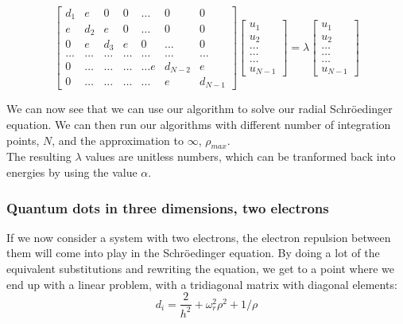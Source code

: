 \documentclass{article}
\begin{document}
			\begin{equation*}
				\begin{bmatrix}
					d_1 & e & 0   & 0    & \dots  &0     & 0 \\
					e & d_2 & e & 0    & \dots  &0     &0 \\
					0   & e & d_3 & e  &0       &\dots & 0\\
					\dots  & \dots & \dots & \dots  &\dots      &\dots & \dots\\
					0   & \dots & \dots & \dots  &\dots  e     &d_{N-2} & e\\
					0   & \dots & \dots & \dots  &\dots       &e & d_{N-1}
				\end{bmatrix} 
				\begin{bmatrix}
					u_{1} \\
					u_{2} \\
					\dots\\ \dots\\ \dots\\
					u_{N-1}
				\end{bmatrix}
				= \lambda \begin{bmatrix}
					u_{1} \\
					u_{2} \\
					\dots\\ \dots\\ \dots\\
					u_{N-1}
				\end{bmatrix}
				\label{eq:sematrix}
			\end{equation*}

			We can now see that we can use our algorithm to solve our radial Schröedinger equation.
			We can then run our algorithms with different number of integration points,
			$N$, and the approximation to $\infty$, $\rho_{max}$.\\
			The resulting $\lambda$ values are unitless numbers,
			which can be tranformed back into energies by using the value $\alpha$.
		 
		\subsubsection{Quantum dots in three dimensions, two electrons}
			If we now consider a system with two electrons,
			the electron repulsion between them will come into play in the Schröedinger equation.
			By doing a lot of the equivalent substitutions and rewriting the equation,
			we get to a point where we end up with a linear problem,
			with a tridiagonal matrix with diagonal elements:
			\begin{equation*}
				d_i = \frac{2}{h^2} + \omega_r^2 \rho^2 + 1/\rho
			\end{equation*}
\end{document}

